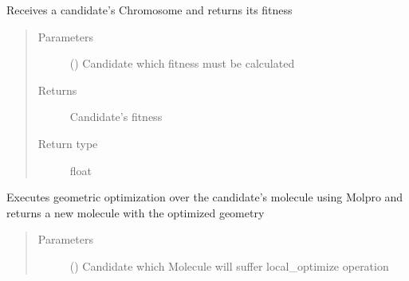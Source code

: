 \documentclass[letterpaper,10pt,english]{sphinxmanual}
\begin{document}
\begin{fulllineitems}
\begin{fulllineitems}
\end{fulllineitems}


\begin{fulllineitems}
\label{\detokenize{MolOpt:MolOpt.MolOpt.MolOpt.get_fitness}}
\sphinxAtStartPar
Receives a candidate’s Chromosome and returns its fitness
\begin{quote}\begin{description}
\item[{Parameters}] \leavevmode
\sphinxAtStartPar
{} ({\hyperref[\detokenize{MolOpt.genetic:MolOpt.genetic.genetic.Chromosome}]{}}) \textendash{} Candidate which fitness must be calculated

\item[{Returns}] \leavevmode
\sphinxAtStartPar
Candidate’s fitness

\item[{Return type}] \leavevmode
\sphinxAtStartPar
float

\end{description}\end{quote}

\end{fulllineitems}


\begin{fulllineitems}
\label{\detokenize{MolOpt:MolOpt.MolOpt.MolOpt.local_optimize}}
\sphinxAtStartPar
Executes geometric optimization over the candidate’s molecule using Molpro and returns a new molecule with 
the optimized geometry
\begin{quote}\begin{description}
\item[{Parameters}] \leavevmode
\sphinxAtStartPar
{} ({\hyperref[\detokenize{MolOpt.genetic:MolOpt.genetic.genetic.Chromosome}]{}}) \textendash{} Candidate which Molecule will suffer local\_optimize operation


\end{description}
\end{quote}
\end{fulllineitems}
\end{fulllineitems}
\end{document}

